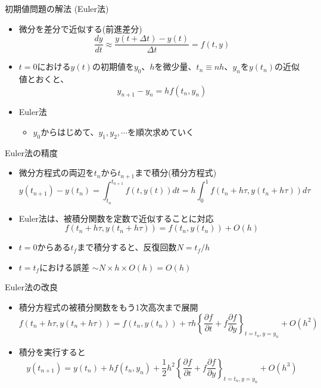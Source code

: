 \begin{frame}[t,fragile]{初期値問題の解法 (Euler法)}
  \begin{itemize}
    \setlength{\itemsep}{1em}
  \item 微分を差分で近似する(前進差分)
    \[
    \frac{dy}{dt} \approx \frac{y(t+\Delta t) - y(t)}{\Delta t} = f(t, y)
    \]
  \item $t=0$における$y(t)$の初期値を$y_0$、$h$を微少量、$t_n \equiv nh$、$y_n$を$y(t_n)$の近似値とおくと、
    \[
    y_{n+1}-y_n = h f( t_n, y_n)
    \]
  \item Euler法
    \begin{itemize}
    \item $y_0$からはじめて、$y_1,y_2,\cdots$を順次求めていく
    \end{itemize}
  \end{itemize}
\end{frame}

\begin{frame}[t,fragile]{Euler法の精度}
  \begin{itemize}
    \setlength{\itemsep}{1em}
  \item 微分方程式の両辺を$t_n$から$t_{n+1}$まで積分(積分方程式)
    \[
    y(t_{n+1}) - y(t_n) = \int^{t_{n+1}}_{t_n} \!\! f(t, y(t)) dt = h \int^1_0 \! f(t_n+h\tau, y(t_n+h\tau)) d\tau
    \]
  \item Euler法は、被積分関数を定数で近似することに対応
    \[
    f(t_n+h\tau, y(t_n+h\tau)) = f(t_n, y(t_n)) + O(h)
    \]
  \item $t=0$からある$t_f$まで積分すると、反復回数$N = t_f / h$
  \item $t=t_f$における誤差 $\sim N \times h \times O(h) = O(h)$
  \end{itemize}
\end{frame}

\begin{frame}[t,fragile]{Euler法の改良}
  \begin{itemize}
    \setlength{\itemsep}{1em}
  \item 積分方程式の被積分関数をもう1次高次まで展開
    \[
    f(t_n+h\tau, y(t_n+h\tau)) = f(t_n, y(t_n)) +
    \tau h
    \left\{
    \frac{\partial f}{\partial t}
    + f \frac{\partial f}{\partial y}
    \right\}_{t=t_n, y=y_n}
    \!\!\!\!\!\!\!\!\!\!\!\! + O(h^2)
    \]
  \item 積分を実行すると
    \[
    y(t_{n+1}) = y(t_n) + h f(t_n, y_n) + \frac{1}{2}h^2
    \left\{
    \frac{\partial f}{\partial t}
    + f \frac{\partial f}{\partial y}
    \right\}_{t=t_n, y=y_n}
    \!\!\!\!\!\!\!\!\!\!\!\! + O(h^3)
    \]
  \end{itemize}
\end{frame}

